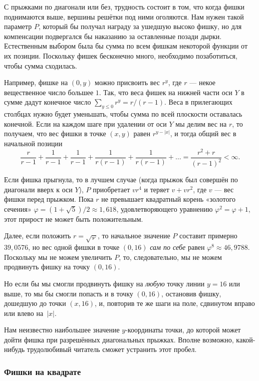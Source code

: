 \medskip

С прыжками по диагонали или без, трудность состоит в том, что когда фишки поднимаются выше, вершины решётки под ними оголяются.
Нам нужен такой параметр $P$, который бы получал награду за ушедшую высоко фишку, но для компенсации подвергался бы наказанию за оставленные позади дырки.
Естественным выбором была бы сумма по всем фишкам некоторой функции от их позиции.
Поскольку фишек бесконечно много, необходимо позаботиться, чтобы сумма сходилась.

Например, фишке на $(0, y)$ можно присвоить вес $r^y$, где $r$ --- некое вещественное число большее $1$.
Так, что веса фишек на нижней части оси $Y$ в сумме дадут конечное число $\sum_{y\le 0}r^y = r/(r-1)$.
Веса в прилегающих столбцах нужно будет уменьшать, чтобы сумма по всей плоскости оставалась конечной.
Если на каждом шаге при удалении от оси $Y$ мы делим вес на $r$, то получаем, что вес фишки в точке $(x, y)$ равен $r^{y - |x|}$, и тогда общий вес в начальной позиции 
\[\frac r{r-1} + \frac 1{r-1} +\frac 1{r-1} +\frac 1{r(r-1)} +\frac 1{r(r-1)} + \dots =\frac{r^2+r}{(r-1)^2} <\infty .\]

Если фишка прыгнула, то в лучшем случае (когда прыжок был совершён по диагонали вверх к оси $Y$), $P$ приобретает $vr^4$ и теряет $v+vr^2$, где $v$ --- вес фишки перед прыжком.
Пока $r$ не превышает квадратный корень «золотого сечения» $\varphi=(1+\sqrt5)/2\approx 1{,}618$, удовлетворяющего уравнению $\varphi^2=\varphi+1$, этот прирост не может быть положительным.

Далее, если положить $r = \sqrt{\varphi}$, то начальное значение $P$ составит примерно $39{,}0576$, но вес одной фишки в точке $(0, 16)$ \emph{сам по себе} равен $\varphi^8\approx 46{,}9788$.
Поскольку мы не можем увеличить $P$, то, следовательно, мы не можем продвинуть фишку на точку $(0, 16)$.

Но если бы мы смогли продвинуть фишку на \emph{любую} точку линии $y = 16$ или выше, то мы бы смогли попасть и в точку $(0, 16)$, остановив фишку, дошедшую до точки $(x, 16)$, и, повторив те же шаги на поле, сдвинутом вправо или влево на~$|x|$.
\heart

{\sloppy 

Нам неизвестно наибольшее значение $y$-координаты точки, до которой может дойти фишка при разрешённых диагональных прыжках.
Вполне возможно, какой-нибудь трудолюбивый читатель сможет устранить этот пробел.

}

\subsubsection*{Фишки на квадрате}%

